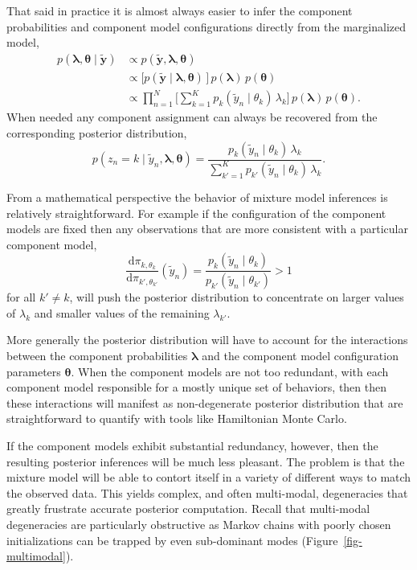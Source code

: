 \documentclass[
  letterpaper,
  DIV=11,
  numbers=noendperiod]{scrartcl}
\begin{document}
That said in practice it is almost always easier to infer the component
probabilities and component model configurations directly from the
marginalized model, \begin{align*}
p(\boldsymbol{\lambda}, \boldsymbol{\theta}
 \mid \tilde{\mathbf{y}} )
&\propto
p(\tilde{\mathbf{y}}, \boldsymbol{\lambda}, \boldsymbol{\theta} )
\\
&\propto
\bigg[
p(\tilde{\mathbf{y}} \mid \boldsymbol{\lambda}, \boldsymbol{\theta} ) \,
\bigg] \,
p( \boldsymbol{\lambda} ) \, p( \boldsymbol{\theta} )
\\
&\propto
\prod_{n = 1}^{N} \bigg[ \sum_{k = 1}^{K}
p_{k}(\tilde{y}_{n} \mid \theta_{k} ) \, \lambda_{k}
\bigg] \,
p( \boldsymbol{\lambda} ) \, p( \boldsymbol{\theta} ).
\end{align*} When needed any component assignment can always be
recovered from the corresponding posterior distribution, \[
p(z_{n} = k \mid
  \tilde{y}_{n}, \boldsymbol{\lambda}, \boldsymbol{\theta})
=
\frac{
p_{k}(\tilde{y}_{n} \mid \theta_{k}) \, \lambda_{k}
}{
\sum_{k' = 1}^{K} p_{k'}(\tilde{y}_{n} \mid \theta_{k}) \, \lambda_{k}
}.
\]

From a mathematical perspective the behavior of mixture model inferences
is relatively straightforward. For example if the configuration of the
component models are fixed then any observations that are more
consistent with a particular component model, \[
\frac
{ \mathrm{d} \pi_{k , \theta_{k}}  }
{ \mathrm{d} \pi_{k', \theta_{k'}} } (\tilde{y}_{n})
=
\frac
{ p_{k}(\tilde{y}_{n} \mid \theta_{k}) }
{ p_{k'}(\tilde{y}_{n} \mid \theta_{k'}) }
> 1
\] for all \(k' \ne k\), will push the posterior distribution to
concentrate on larger values of \(\lambda_{k}\) and smaller values of
the remaining \(\lambda_{k'}\).

More generally the posterior distribution will have to account for the
interactions between the component probabilities
\(\boldsymbol{\lambda}\) and the component model configuration
parameters \(\boldsymbol{\theta}\). When the component models are not
too redundant, with each component model responsible for a mostly unique
set of behaviors, then then these interactions will manifest as
non-degenerate posterior distribution that are straightforward to
quantify with tools like Hamiltonian Monte Carlo.

If the component models exhibit substantial redundancy, however, then
the resulting posterior inferences will be much less pleasant. The
problem is that the mixture model will be able to contort itself in a
variety of different ways to match the observed data. This yields
complex, and often multi-modal, degeneracies that greatly frustrate
accurate posterior computation. Recall that multi-modal degeneracies are
particularly obstructive as Markov chains with poorly chosen
initializations can be trapped by even sub-dominant modes
(Figure~\ref{fig-multimodal}).
\end{document}
